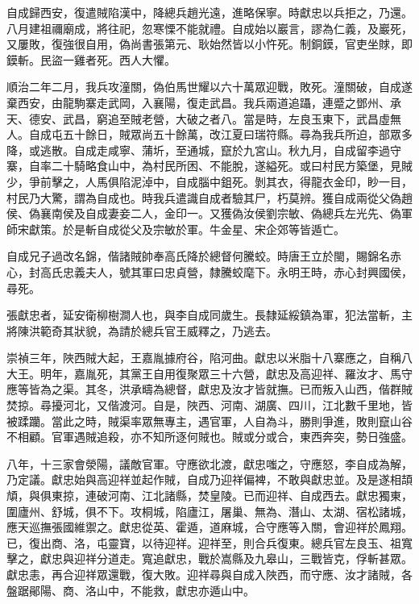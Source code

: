\begin{pinyinscope}
自成歸西安，復遣賊陷漢中，降總兵趙光遠，進略保寧。時獻忠以兵拒之，乃還。八月建祖禰廟成，將往祀，忽寒慄不能就禮。自成始以巖言，謬為仁義，及巖死，又屢敗，復強很自用，偽尚書張第元、耿始然皆以小忤死。制銅鏌，官吏坐賕，即鏌斬。民盜一雞者死。西人大懼。

順治二年二月，我兵攻潼關，偽伯馬世耀以六十萬眾迎戰，敗死。潼關破，自成遂棄西安，由龍駒寨走武岡，入襄陽，復走武昌。我兵兩道追躡，連蹙之鄧州、承天、德安、武昌，窮追至賊老營，大破之者八。當是時，左良玉東下，武昌虛無人。自成屯五十餘日，賊眾尚五十餘萬，改江夏曰瑞符縣。尋為我兵所迫，部眾多降，或逃散。自成走咸寧、蒲圻，至通城，竄於九宮山。秋九月，自成留李過守寨，自率二十騎略食山中，為村民所困、不能脫，遂縊死。或曰村民方築堡，見賊少，爭前擊之，人馬俱陷泥淖中，自成腦中鉏死。剝其衣，得龍衣金印，眇一目，村民乃大驚，謂為自成也。時我兵遣識自成者驗其尸，朽莫辨。獲自成兩從父偽趙侯、偽襄南侯及自成妻妾二人，金印一。又獲偽汝侯劉宗敏、偽總兵左光先、偽軍師宋獻策。於是斬自成從父及宗敏於軍。牛金星、宋企郊等皆遁亡。

自成兄子過改名錦，偕諸賊帥奉高氏降於總督何騰蛟。時唐王立於閩，賜錦名赤心，封高氏忠義夫人，號其軍曰忠貞營，隸騰蛟麾下。永明王時，赤心封興國侯，尋死。

張獻忠者，延安衛柳樹澗人也，與李自成同歲生。長隸延綏鎮為軍，犯法當斬，主將陳洪範奇其狀貌，為請於總兵官王威釋之，乃逃去。

崇禎三年，陜西賊大起，王嘉胤據府谷，陷河曲。獻忠以米脂十八寨應之，自稱八大王。明年，嘉胤死，其黨王自用復聚眾三十六營，獻忠及高迎祥、羅汝才、馬守應等皆為之渠。其冬，洪承疇為總督，獻忠及汝才皆就撫。已而叛入山西，偕群賊焚掠。尋擾河北，又偕渡河。自是，陜西、河南、湖廣、四川，江北數千里地，皆被蹂躪。當此之時，賊渠率眾無專主，遇官軍，人自為斗，勝則爭進，敗則竄山谷不相顧。官軍遇賊追殺，亦不知所逐何賊也。賊或分或合，東西奔突，勢日強盛。

八年，十三家會滎陽，議敵官軍。守應欲北渡，獻忠嗤之，守應怒，李自成為解，乃定議。獻忠始與高迎祥並起作賊，自成乃迎祥偏裨，不敢與獻忠並。及是遂相頡頏，與俱東掠，連破河南、江北諸縣，焚皇陵。已而迎祥、自成西去。獻忠獨東，圍廬州、舒城，俱不下。攻桐城，陷廬江，屠巢、無為、潛山、太湖、宿松諸城，應天巡撫張國維禦之。獻忠從英、霍遁，道麻城，合守應等入關，會迎祥於鳳翔。已，復出商、洛，屯靈寶，以待迎祥。迎祥至，則合兵復東。總兵官左良玉、祖寬擊之，獻忠與迎祥分道走。寬追獻忠，戰於嵩縣及九皋山，三戰皆克，俘斬甚眾。獻忠恚，再合迎祥眾還戰，復大敗。迎祥尋與自成入陜西，而守應、汝才諸賊，各盤踞鄖陽、商、洛山中，不能救，獻忠亦遁山中。


\end{pinyinscope}

